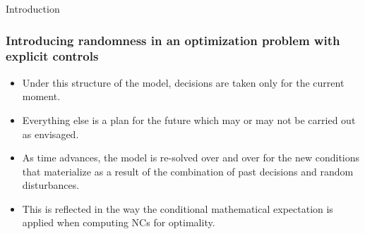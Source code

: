 \documentclass[10pt]{beamer}
\theoremstyle{definition}
\begin{document}
\begin{section}{Introduction}
\begin{frame}
\frametitle{Introducing randomness in an optimization problem with explicit controls }
\begin{itemize}\itemsep1em
\item Under this structure of the model, decisions are taken only for the current moment.
\item Everything else is a plan for the future which may or may not be carried out as envisaged.
\item As time advances, the model is re-solved over and over for the new conditions that materialize as a result of the combination of past decisions and random disturbances.
\item This is reflected in the way the conditional mathematical expectation is applied when computing NCs for optimality.
\end{itemize}
\end{frame}
\end{section}
\end{document}
